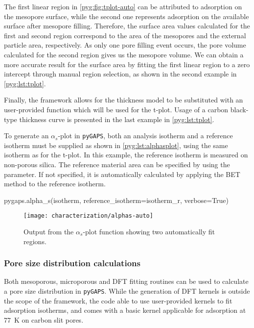 The first linear region in \autoref{pyg:fig:tplot-auto} can be attributed
to adsorption on the mesopore surface,
while the second one represents adsorption on the available surface
after mesopore filling. Therefore, the surface area values calculated 
for the first and second region correspond to the area of the mesopores
and the external particle area, respectively. As only one pore filling 
event occurs, the pore volume calculated for the second region gives
us the mesopore volume. We can obtain a more accurate result for the
surface area by fitting the first linear region to a zero intercept
through manual region selection, as shown in the second example in 
\autoref{pyg:lst:tplot}.

Finally, the framework allows for the thickness model to be substituted
with an user-provided function which will be used for the t-plot.
Usage of a carbon black-type thickness curve is presented in the last
example in \autoref{pyg:lst:tplot}.

To generate an \(\alpha_s\)-plot in \texttt{pyGAPS}, both 
an analysis isotherm and a reference isotherm must be supplied 
as shown in \autoref{pyg:lst:alphasplot}, using the same isotherm
as for the t-plot.
In this example, the reference isotherm is measured on non-porous 
silica. The reference material area can be specified by using 
the  parameter. If not specified, it 
is automatically calculated by applying the \gls{BET}
method to the reference isotherm.

\begin{python}[caption={Generating an \(\alpha_s\)-plot},label={pyg:lst:alphasplot}]
pygaps.alpha_s(isotherm, 
			   reference_isotherm=isotherm_r,
			   verbose=True)
\end{python}

\begin{figure}[!htb]
	\centering

	\texttt{[image: characterization/alphas-auto]}
	\caption{Output from the \(\alpha_s\)-plot function showing two
		automatically fit regions.}%
	\label{pyg:fig:alphasplot}

\end{figure}


\subsubsection{Pore size distribution calculations}

Both mesoporous, microporous and \gls{DFT} fitting routines can be
used to calculate a pore size distribution in \texttt{pyGAPS}. 
While the generation of \gls{DFT} kernels is outside the scope of the
framework, the code able to use user-provided kernels to fit adsorption 
isotherms, and comes with a basic kernel applicable for  
adsorption at \SI{77}{\kelvin} on carbon slit pores.

